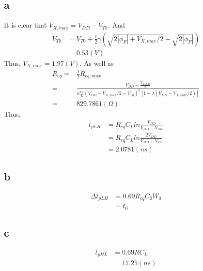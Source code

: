 \documentclass[a4paper,10pt]{article}
\begin{document}
\subsection*{a}
It is clear that \begin{math}V_{X, max} = V_{DD} - V_{Th}\end{math}. And
\begin{equation}
 \begin{split}
  V_{Th} &= V_{T0} + \frac{1}{2}\gamma(\sqrt{2|\phi_F| + V_{X, max}/2} -\sqrt{2|\phi_F|})\\
  &=0.53(V)
 \end{split}
\end{equation}
Thus, \begin{math}V_{X, max}=1.97(V)\end{math}. As well as
\begin{equation}
 \begin{split}
  R_{eq}=& \frac{1}{2} R_{eq, max}\\
  =& \frac{V_{DD}-\frac{V_{X, max}}{2}}{\kappa\frac{W}{L}(V_{DD}-V_{X,max}/2 -V_{Th})^2 [1+\lambda(V_{DD}-V_{X, max}/2)]}\\
  =& 829.7861(\Omega)
 \end{split}
\end{equation}
Thus,
\begin{equation}
\begin{split}
t_{pLH} &= R_{eq}C_L ln\frac{V_{DD}}{V_{DD} - V_{out}}\\
&= R_{eq}C_L ln\frac{2V_{DD}}{V_{DD} + V_{Th}}\\
&= 2.0781(ns)
\end{split}
\end{equation}
\subsection*{b}
\begin{equation}
\begin{split}
\Delta t_{pLH} &= 0.69R_{eq}C_0 W_0\\
&= t_0
\end{split}
\end{equation}
\subsection*{c}
\begin{equation}
\begin{split}
t_{pHL} &= 0.69RC_L\\
& = 17.25 (ns)
\end{split}
\end{equation}
\end{document}
